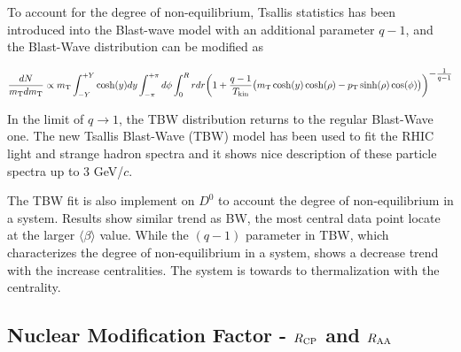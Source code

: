 To account for the degree of non-equilibrium, Tsallis statistics has been introduced into the Blast-wave model with an additional parameter $q-1$, and the Blast-Wave distribution can be modified as

\begin{equation}
\frac{dN}{m_{\rm T}dm_{\rm T}} \propto m_{\rm T}\int_{-Y}^{+Y}\cosh(y)dy \int_{-\pi}^{+\pi} d\phi \int_0^R rdr \bigg(1+\frac{q-1}{T_{\rm kin}}\big(m_{\rm T}\cosh(y)\cosh(\rho)-p_{\rm T}\sinh(\rho)\cos(\phi)\big)\bigg)^{\textstyle -\frac{1}{q-1}}
\end{equation}

In the limit of $q\rightarrow 1$, the TBW distribution returns to the regular Blast-Wave one. The new Tsallis Blast-Wave (TBW) model has been used to fit the RHIC light and strange hadron spectra and it shows nice description of these particle spectra up to 3 GeV/$c$.

The TBW fit is also implement on $D^0$ to account the degree of non-equilibrium in a system. Results show similar trend as BW, the most central data point locate at the larger $\langle\beta\rangle$ value. While the $(q-1)$ parameter in TBW, which characterizes the degree of non-equilibrium in a system, shows a decrease trend with the increase centralities. The system is towards to thermalization with the centrality.


\subsection{\label{result:RCP}Nuclear Modification Factor - $R_{\rm CP}$ and  $R_{\rm AA}$}

